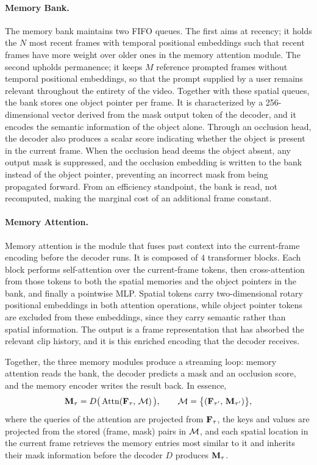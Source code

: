 \paragraph{Memory Bank.} The memory bank maintains two FIFO queues. The first aims at recency; it holds the $N$ most recent frames with temporal positional embeddings such that recent frames have more weight over older ones in the memory attention module. The second upholds permanence; it keeps $M$ reference prompted frames without temporal positional embeddings, so that the prompt supplied by a user remains relevant throughout the entirety of the video. Together with these spatial queues, the bank stores one object pointer per frame. It is characterized by a 256-dimensional vector derived from the mask output token of the decoder, and it encodes the semantic information of the object alone. Through an occlusion head, the decoder also produces a scalar score indicating whether the object is present in the current frame. When the occlusion head deems the object absent, any output mask is suppressed, and the occlusion embedding is written to the bank instead of the object pointer, preventing an incorrect mask from being propagated forward. From an efficiency standpoint, the bank is read, not recomputed, making the marginal cost of an additional frame constant.

\paragraph{Memory Attention.} Memory attention is the module that fuses past context into the current-frame encoding before the decoder runs. It is composed of $4$ transformer blocks. Each block performs self-attention over the current-frame tokens, then cross-attention from those tokens to both the spatial memories and the object pointers in the bank, and finally a pointwise MLP. Spatial tokens carry two-dimensional rotary positional embeddings in both attention operations, while object pointer tokens are excluded from these embeddings, since they carry semantic rather than spatial information. The output is a frame representation that has absorbed the relevant clip history, and it is this enriched encoding that the decoder receives. 

Together, the three memory modules produce a streaming loop: memory attention reads the bank, the decoder predicts a mask and an occlusion score, and the memory encoder writes the result back. In essence,
\begin{equation}
\mathbf{M}_\tau = D\big(\, \mathrm{Attn}(\mathbf{F}_\tau,\, \mathcal{M}) \,\big),
\qquad
\mathcal{M} = \big\{ (\mathbf{F}_{\tau'},\, \mathbf{M}_{\tau'}) \big\},
\label{eq:mem-attn}
\end{equation}
where the queries of the attention are projected from $\mathbf{F}_\tau$, the keys and values are projected from the stored (frame, mask) pairs in $\mathcal{M}$, and each spatial location in the current frame retrieves the memory entries most similar to it and inherits their mask information before the decoder $D$ produces $\mathbf{M}_\tau$. 

